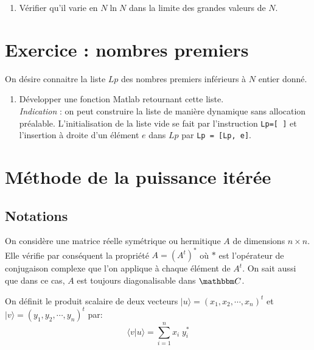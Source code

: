 \documentclass[a4paper, 12pt]{article}
\begin{document}
\begin{enumerate}
\item Vérifier qu'il varie en $N \ln N$ dans la limite des grandes valeurs de $N$.


\end{enumerate} 

\section{Exercice : nombres premiers}

On désire connaitre la liste $Lp$ des nombres premiers inférieurs à $N$ entier donné.
\begin{enumerate} 
\item Développer une fonction Matlab retournant cette liste.\\

{\it Indication } : on peut construire la liste de manière dynamique sans allocation préalable.
L'initialisation de la liste vide se fait par l'instruction {\tt Lp=[ ]} et l'insertion
à droite d'un élément $e$ dans $Lp$ par {\tt Lp = [Lp, e]}.
\end{enumerate} 
 
 \section{Méthode de la puissance itérée}

\subsection{Notations}

On considère une matrice réelle symétrique ou hermitique $A$ de dimensions $n \times n$.
Elle vérifie par conséquent la propriété $A=(A^t)^*$ où $*$ est l'opérateur de conjugaison
complexe que l'on applique à chaque élément de $A^t$. On sait aussi que dans ce cas, $A$ est toujours diagonalisable dans $\mathbbm C$.

On définit le produit scalaire de deux vecteurs  $| u\rangle=\left(x_1, x_2, \cdots, x_n \right)^t$ et $| v\rangle=\left(y_1, y_2, \cdots, y_n \right)^t$ par:
\begin{equation}
\langle v | u \rangle= \sum_{i=1}^{n} x_i \; y_i^*
\end{equation}
\end{document}
